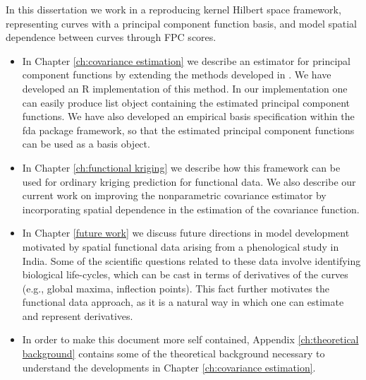 In this dissertation we work in a reproducing kernel Hilbert space framework, representing curves with a principal component function basis, and model spatial dependence between curves through FPC scores.  
\begin{itemize}
\item In Chapter \ref{ch:covariance estimation} we describe an estimator for principal component functions by extending the methods developed in \cite{Cai:2010vr}. We have developed an R implementation of this method. In our implementation one can easily produce list object containing the estimated principal component functions. We have also developed an empirical basis specification  within the fda package framework, so that the estimated principal component functions can be used as a basis object.  %
\item In Chapter \ref{ch:functional kriging} we describe how this framework can be used for ordinary kriging prediction for functional data. We also describe our current work on improving the nonparametric covariance estimator by incorporating spatial dependence in the estimation of the covariance function. 
\item  In Chapter \ref{future work} we discuss future directions in model development motivated by spatial functional data arising from a phenological study in India. Some of the scientific questions related to these data involve identifying biological life-cycles, which can be cast in terms of derivatives of the curves (e.g., global maxima, inflection points). This fact further motivates the functional data approach, as it is a natural way in which one can estimate and represent derivatives. 
\item In order to make this document more self contained, Appendix \ref{ch:theoretical background} contains some of the theoretical background necessary to understand the developments in Chapter \ref{ch:covariance estimation}. 
\end{itemize}


